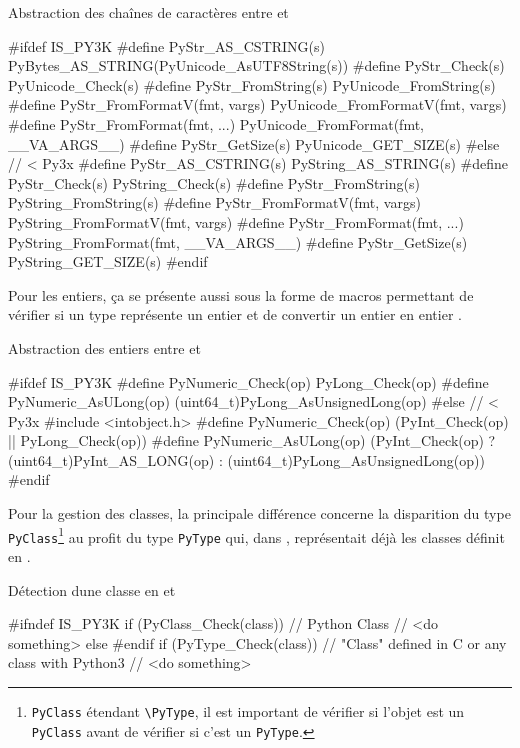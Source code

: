   \begin{listing}[H]
    \caption{Abstraction des chaînes de caractères entre  et }
\begin{ccode}
#ifdef IS_PY3K
#define PyStr_AS_CSTRING(s) PyBytes_AS_STRING(PyUnicode_AsUTF8String(s))
#define PyStr_Check(s) PyUnicode_Check(s)
#define PyStr_FromString(s) PyUnicode_FromString(s)
#define PyStr_FromFormatV(fmt, vargs) PyUnicode_FromFormatV(fmt, vargs)
#define PyStr_FromFormat(fmt, ...) PyUnicode_FromFormat(fmt, __VA_ARGS__)
#define PyStr_GetSize(s) PyUnicode_GET_SIZE(s)
#else // < Py3x
#define PyStr_AS_CSTRING(s) PyString_AS_STRING(s)
#define PyStr_Check(s) PyString_Check(s)
#define PyStr_FromString(s) PyString_FromString(s)
#define PyStr_FromFormatV(fmt, vargs) PyString_FromFormatV(fmt, vargs)
#define PyStr_FromFormat(fmt, ...) PyString_FromFormat(fmt, __VA_ARGS__)
#define PyStr_GetSize(s) PyString_GET_SIZE(s)
#endif
\end{ccode}
  \end{listing}
  
Pour les entiers, ça se présente aussi sous la forme de macros permettant de vérifier si un type \Python représente un entier et de convertir un entier \Python en entier \C.

  \begin{listing}[H]
    \caption{Abstraction des entiers entre  et }
\begin{ccode}
#ifdef IS_PY3K
#define PyNumeric_Check(op) PyLong_Check(op)
#define PyNumeric_AsULong(op) (uint64_t)PyLong_AsUnsignedLong(op)
#else // < Py3x
#include <intobject.h>
#define PyNumeric_Check(op) (PyInt_Check(op) || PyLong_Check(op))
#define PyNumeric_AsULong(op) (PyInt_Check(op) ? (uint64_t)PyInt_AS_LONG(op) : (uint64_t)PyLong_AsUnsignedLong(op))
#endif
\end{ccode}
  \end{listing} 
  
Pour la gestion des classes, la principale différence concerne la disparition du type \verb|PyClass|\footnote{\verb?PyClass? étendant \verb?\PyType?, il est important de vérifier si l'objet est un \verb?PyClass? avant de vérifier si c'est un \verb?PyType?.} au profit du type \verb|PyType| qui, dans , représentait déjà les classes définit en \C.

  \begin{listing}[H]
    \caption{Détection dune classe en  et }
\begin{ccode}
#ifndef IS_PY3K
if (PyClass_Check(class)) {
	// Python Class
	// <do something>
} else
#endif
if (PyType_Check(class)) {
	// "Class" defined in C or any class with Python3
	// <do something>
}
\end{ccode}
  \end{listing}
  
